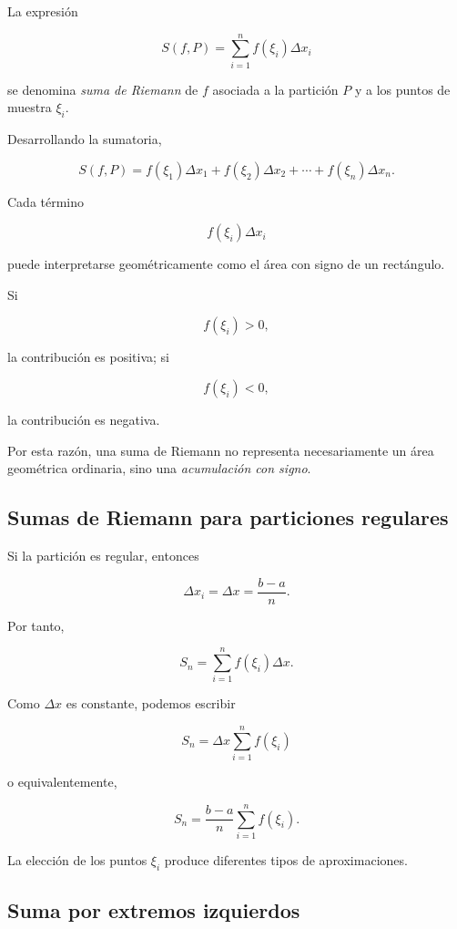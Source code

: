 \documentclass[12pt]{article}
\begin{document}
La expresión

\[
\boxed{
S(f,P)
=
\sum_{i=1}^{n}
f(\xi_i)\Delta x_i
}
\]

se denomina \emph{suma de Riemann} de $f$ asociada a la partición $P$
y a los puntos de muestra $\xi_i$.

Desarrollando la sumatoria,

\[
S(f,P)
=
f(\xi_1)\Delta x_1
+
f(\xi_2)\Delta x_2
+
\cdots
+
f(\xi_n)\Delta x_n.
\]

Cada término

\[
f(\xi_i)\Delta x_i
\]

puede interpretarse geométricamente como el área con signo de un
rectángulo.

Si

\[
f(\xi_i)>0,
\]

la contribución es positiva; si

\[
f(\xi_i)<0,
\]

la contribución es negativa.

Por esta razón, una suma de Riemann no representa necesariamente un área
geométrica ordinaria, sino una \emph{acumulación con signo}.

\subsection{Sumas de Riemann para particiones regulares}

Si la partición es regular, entonces

\[
\Delta x_i=\Delta x=\frac{b-a}{n}.
\]

Por tanto,

\[
S_n
=
\sum_{i=1}^{n}
f(\xi_i)\Delta x.
\]

Como $\Delta x$ es constante, podemos escribir

\[
\boxed{
S_n
=
\Delta x
\sum_{i=1}^{n}f(\xi_i)
}
\]

o equivalentemente,

\[
S_n
=
\frac{b-a}{n}
\sum_{i=1}^{n}f(\xi_i).
\]

La elección de los puntos $\xi_i$ produce diferentes tipos de
aproximaciones.

\subsection{Suma por extremos izquierdos}
\end{document}
